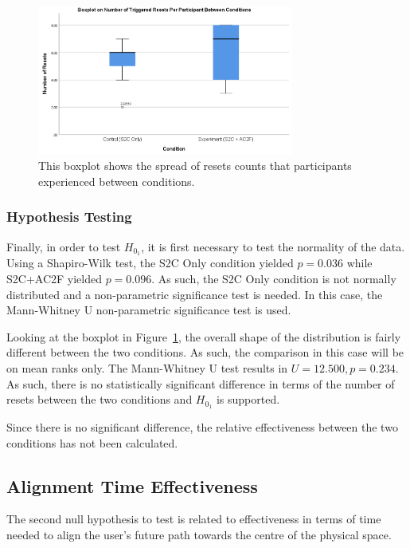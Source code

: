 \begin{figure}[tbph]
    \centering
    \includegraphics[width=0.75\textwidth]{figures/graphs/resetCountBoxPlot.png}
    \caption[Boxplot on Number of Resets Per Participant Between Conditions for Experiment 2]{This boxplot shows the spread of resets counts that participants experienced between conditions.}
    \label{fig:ex2resetboxplot}
\end{figure}

\subsubsection{Hypothesis Testing}
Finally, in order to test $H_{0_1}$, it is first necessary to test the normality of the data. Using a Shapiro-Wilk test, the S2C Only condition yielded $p = 0.036$ while S2C+AC2F yielded $p = 0.096$. As such, the S2C Only condition is not normally distributed and a non-parametric significance test is needed. In this case, the Mann-Whitney U non-parametric significance test is used. 

Looking at the boxplot in Figure~\ref{fig:ex2resetboxplot}, the overall shape of the distribution is fairly different between the two conditions. As such, the comparison in this case will be on mean ranks only. The Mann-Whitney U test results in $U = 12.500, p = 0.234$. As such, there is no statistically significant difference in terms of the number of resets between the two conditions and $H_{0_1}$ is supported.

Since there is no significant difference, the relative effectiveness between the two conditions has not been calculated.

\subsection{Alignment Time Effectiveness}
The second null hypothesis to test is related to effectiveness in terms of time needed to align the user's future path towards the centre of the physical space. 

